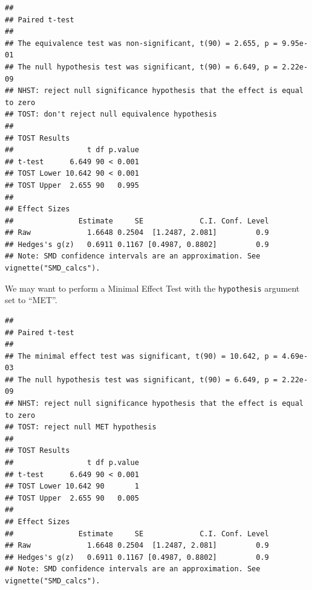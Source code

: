 \documentclass[]{interact}
\theoremstyle{plain}%
\theoremstyle{definition}
\theoremstyle{remark}
\newenvironment{Shaded}{\begin{snugshade}}{\end{snugshade}}
\newcommand{\AttributeTok}[1]{\textcolor[rgb]{0.77,0.63,0.00}{#1}}
\newcommand{\ConstantTok}[1]{\textcolor[rgb]{0.00,0.00,0.00}{#1}}
\newcommand{\DecValTok}[1]{\textcolor[rgb]{0.00,0.00,0.81}{#1}}
\newcommand{\FunctionTok}[1]{\textcolor[rgb]{0.00,0.00,0.00}{#1}}
\newcommand{\NormalTok}[1]{#1}
\newcommand{\OtherTok}[1]{\textcolor[rgb]{0.56,0.35,0.01}{#1}}
\newcommand{\SpecialCharTok}[1]{\textcolor[rgb]{0.00,0.00,0.00}{#1}}
\newcommand{\StringTok}[1]{\textcolor[rgb]{0.31,0.60,0.02}{#1}}
\begin{document}
\begin{verbatim}
## 
## Paired t-test
## 
## The equivalence test was non-significant, t(90) = 2.655, p = 9.95e-01
## The null hypothesis test was significant, t(90) = 6.649, p = 2.22e-09
## NHST: reject null significance hypothesis that the effect is equal to zero 
## TOST: don't reject null equivalence hypothesis
## 
## TOST Results 
##                 t df p.value
## t-test      6.649 90 < 0.001
## TOST Lower 10.642 90 < 0.001
## TOST Upper  2.655 90   0.995
## 
## Effect Sizes 
##               Estimate     SE             C.I. Conf. Level
## Raw             1.6648 0.2504  [1.2487, 2.081]         0.9
## Hedges's g(z)   0.6911 0.1167 [0.4987, 0.8802]         0.9
## Note: SMD confidence intervals are an approximation. See vignette("SMD_calcs").
\end{verbatim}

\newpage

We may want to perform a Minimal Effect Test with the
\texttt{hypothesis} argument set to ``MET''.

\begin{Shaded}
\end{Shaded}

\begin{verbatim}
## 
## Paired t-test
## 
## The minimal effect test was significant, t(90) = 10.642, p = 4.69e-03
## The null hypothesis test was significant, t(90) = 6.649, p = 2.22e-09
## NHST: reject null significance hypothesis that the effect is equal to zero 
## TOST: reject null MET hypothesis
## 
## TOST Results 
##                 t df p.value
## t-test      6.649 90 < 0.001
## TOST Lower 10.642 90       1
## TOST Upper  2.655 90   0.005
## 
## Effect Sizes 
##               Estimate     SE             C.I. Conf. Level
## Raw             1.6648 0.2504  [1.2487, 2.081]         0.9
## Hedges's g(z)   0.6911 0.1167 [0.4987, 0.8802]         0.9
## Note: SMD confidence intervals are an approximation. See vignette("SMD_calcs").
\end{verbatim}
\end{document}
